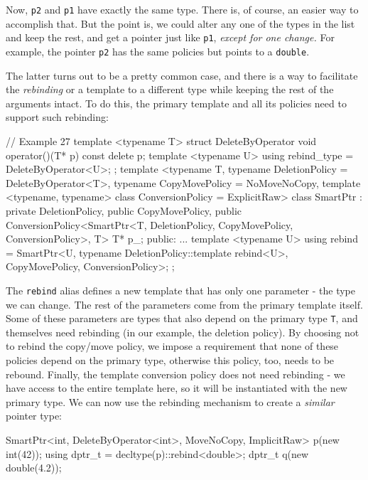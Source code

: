 Now, \texttt{p2} and \texttt{p1} have exactly the same type. There is, of course, an easier way to accomplish that. But the point is, we could alter any one of the types in the list and keep the rest, and get a pointer just like \texttt{p1}, \emph{except for one change.} For example, the pointer \texttt{p2} has the same policies but points to a \texttt{double}.

The latter turns out to be a pretty common case, and there is a way to facilitate the \emph{rebinding} or a template to a different type while keeping the rest of the arguments intact. To do this, the primary template and all its policies need to support such rebinding:

\begin{code}
// Example 27
template <typename T> struct DeleteByOperator {
  void operator()(T* p) const { delete p; }
  template <typename U>
    using rebind_type = DeleteByOperator<U>;
};
template <typename T,
          typename DeletionPolicy = DeleteByOperator<T>,
          typename CopyMovePolicy = NoMoveNoCopy,
          template <typename, typename>
            class ConversionPolicy = ExplicitRaw>
class SmartPtr : private DeletionPolicy,
  public CopyMovePolicy,
  public ConversionPolicy<SmartPtr<T, DeletionPolicy,
    CopyMovePolicy, ConversionPolicy>, T> {
  T* p_;
  public:
  ...
  template <typename U>
  using rebind = SmartPtr<U,
    typename DeletionPolicy::template rebind<U>,
    CopyMovePolicy, ConversionPolicy>;
};
\end{code}

The \texttt{rebind} alias defines a new template that has only one parameter - the type we can change. The rest of the parameters come from the primary template itself. Some of these parameters are types that also depend on the primary type \texttt{T}, and themselves need rebinding (in our example, the deletion policy). By choosing not to rebind the copy/move policy, we impose a requirement that none of these policies depend on the primary type, otherwise this policy, too, needs to be rebound. Finally, the template conversion policy does not need rebinding - we have access to the entire template here, so it will be instantiated with the new primary type. We can now use the rebinding mechanism to create a \emph{similar} pointer type:

\begin{code}
SmartPtr<int,
  DeleteByOperator<int>, MoveNoCopy, ImplicitRaw>
p(new int(42));
using dptr_t = decltype(p)::rebind<double>;
dptr_t q(new double(4.2));
\end{code}

